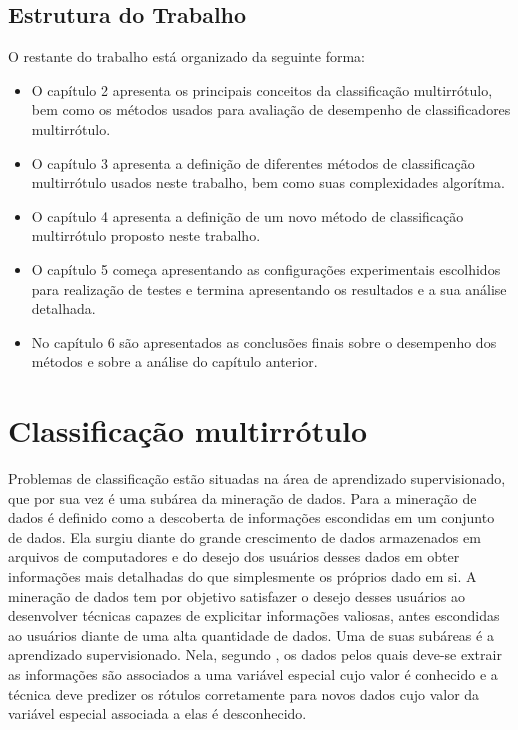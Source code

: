 \section{Estrutura do Trabalho}
O restante do trabalho está organizado da seguinte forma:
\begin{itemize}
 \item O capítulo 2 apresenta os principais conceitos da classificação multirrótulo, bem como
 os métodos usados para avaliação de desempenho de classificadores multirrótulo.
 \item O capítulo 3 apresenta a definição de diferentes métodos de classificação multirrótulo usados neste trabalho,
 bem como suas complexidades algorítma.
 \item O capítulo 4 apresenta a definição de um novo método de classificação multirrótulo proposto neste trabalho.
 \item O capítulo 5 começa apresentando as configurações experimentais escolhidos para realização de testes e termina
 apresentando os resultados e a sua análise detalhada.
 \item No capítulo 6 são apresentados as conclusões finais sobre o desempenho dos métodos e sobre a análise do capítulo anterior.
\end{itemize}


\chapter{Classificação multirrótulo}

Problemas de classificação estão situadas na área de aprendizado supervisionado, que por sua vez é uma 
subárea da mineração de dados. Para \cite{dunham2003introductory} a mineração de dados é definido como a descoberta
de informações escondidas em um conjunto de dados. Ela surgiu diante do grande crescimento de dados armazenados
em arquivos de computadores e do desejo dos usuários desses dados em obter informações mais detalhadas do que simplesmente
os próprios dado em si. A mineração de dados tem por objetivo satisfazer o desejo desses usuários ao desenvolver técnicas
capazes de explicitar informações valiosas, antes escondidas ao usuários diante de uma alta quantidade de dados.
Uma de suas subáreas é a aprendizado supervisionado. Nela, segundo \cite{mohri2012foundations},
os dados pelos quais deve-se extrair as informações são associados a uma variável especial cujo valor
é conhecido e a técnica deve predizer os rótulos
corretamente para novos dados cujo valor da variável especial associada a elas é desconhecido.

